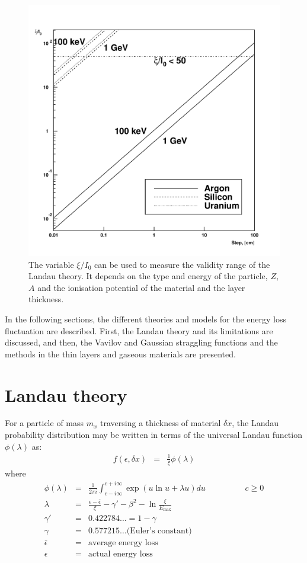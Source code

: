 \documentclass{article}
\newcommand{\Emax}{\ensuremath{E_{\mathrm{max}}}}
\begin{document}
\begin{figure}
   \centering
   \includegraphics[width=.6\linewidth]{phys332-1}
   \caption{The variable $\xi/I_0$ can be used to measure the 
            validity range of the Landau theory. It depends
            on the type and energy of the particle, $Z$, $A$
            and the ionisation potential of the material and
            the layer thickness. 
            }
    \label{fg:phys332-1}
\end{figure}

In the following sections, the different theories and models for the
energy loss fluctuation are described. First, the Landau theory and
its limitations are discussed, and then, the Vavilov and Gaussian
straggling functions and the methods in the thin layers and gaseous
materials are presented.

\section{Landau theory}
\label{sec:phys332-1}

For a particle of mass $m_x$ traversing a thickness of material
$\delta x $, the Landau probability distribution may be written in
terms of the universal Landau function $\phi(\lambda)$
as\cite{bib-LAND}:
\begin{eqnarray*}
f( \epsilon , \delta x ) & = &\frac{1}{\xi} \phi ( \lambda )    
\end{eqnarray*}
where
\begin{eqnarray*}
\phi(\lambda )& = & \frac{1} {2 \pi i}\int^{c+i\infty}_{c-i\infty}
\exp \left ( u \ln u + \lambda u \right ) du \hspace{2cm} c \geq 0 \\
\lambda       & = & \frac{\epsilon  -\bar{\epsilon} }{\xi}
  - \gamma' - \beta^2 - \ln \frac{\xi}{\Emax}          \\
\gamma' & = & 0.422784\dots = 1 - \gamma \\
\gamma             & = & 0.577215\dots \mbox{(Euler's constant)}   \\
\bar{\epsilon}  & = & \mbox{average energy loss}                    \\
\epsilon      & = & \mbox{actual energy loss}
\end{eqnarray*}
\end{document}
